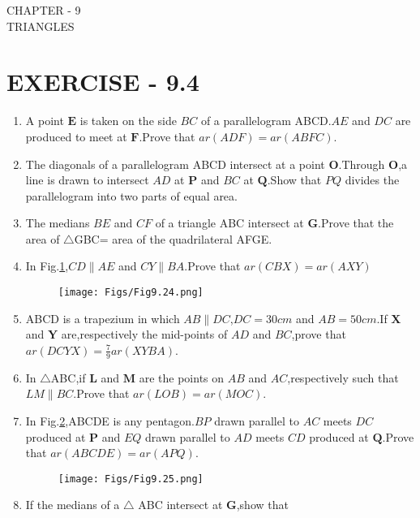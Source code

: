 \documentclass[12pt]{article}
\let\vec\mathbf
\begin{document}
\begin{center}
\textbf\large{CHAPTER - 9  \\  TRIANGLES}
\section*{EXERCISE - 9.4}
\end{center}

\begin{enumerate}

\item A point $\vec{E} $ is taken on the side $BC$ of a parallelogram ABCD.$AE$ and  $DC$ are produced to meet at $\vec{F}$.Prove that  $ar (ADF) = ar (ABFC)$.
\item The diagonals of a parallelogram ABCD intersect at a point $\vec{O}$.Through $\vec{O}$,a line is drawn to intersect $AD$ at $\vec{P}$ and $BC$ at $\vec{Q}$.Show that $PQ$ divides the parallelogram into two parts of equal area.
\item The medians $BE$ and $CF$ of a triangle ABC intersect at $\vec{G}$.Prove that the area of $ \triangle${GBC}= area of the quadrilateral AFGE.	
\item In Fig.\ref{fig:9.24},$CD \parallel AE$  and $CY \parallel BA$.Prove that  $ar (CBX) =  ar (AXY)$
\begin{figure}[h]
	\centering
	\texttt{[image: Figs/Fig9.24.png]}
	\caption{}
	\label{fig:9.24}
\end{figure}
\item ABCD is a trapezium in which $AB \parallel DC$,$DC = 30cm$  and $AB = 50cm$.If $\vec{X}$ and $\vec{Y}$ are,respectively the mid-points of $AD$ and $BC$,prove that  $ar (DCYX) = \frac{7}{9} ar (XYBA)$.
\item  In $ \triangle${ABC},if $\vec{L}$ and $\vec{M}$ are the points on $AB$ and $AC$,respectively such that $LM \parallel BC$.Prove that $ar (LOB) = ar (MOC)$.
\item In Fig.\ref{fig:9.25},ABCDE is any pentagon.$BP$ drawn parallel to $AC$ meets $DC$ produced at $\vec{P}$ and $EQ$ drawn parallel to $AD$ meets $CD$ produced at $\vec{Q}$.Prove that  $ ar (ABCDE) = ar (APQ) $.
\begin{figure}[h]
	\centering
	\texttt{[image: Figs/Fig9.25.png]}
	\caption{}
	\label{fig:9.25}
\end{figure}
\item If the medians of a $ \triangle$ ABC  intersect at $\vec{G}$,show that
    \begin{equation} 

\end{equation}
\end{enumerate}
\end{document}
